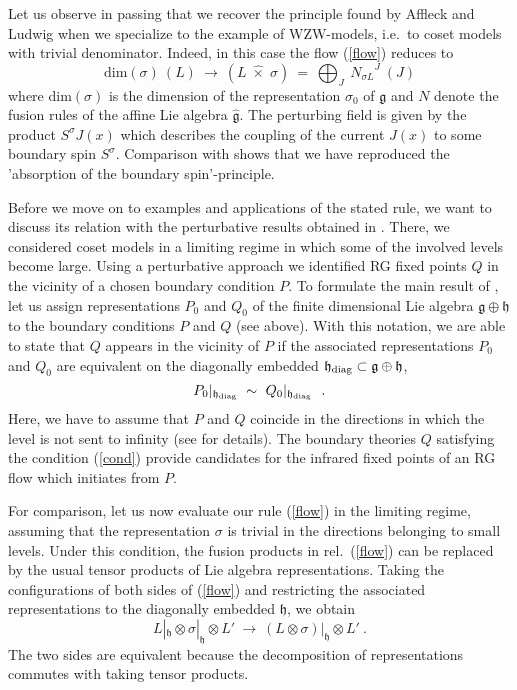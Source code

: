 \documentclass[a4paper,prd,twocolumn,nobibnotes,amssymb,preprintnumbers]{revtex4}
\begin{document}
Let us observe in passing that we recover the principle found by 
Affleck and Ludwig when we specialize to the example of WZW-models, 
i.e.\ to coset models with trivial denominator. Indeed, in this 
case the flow (\ref{flow}) reduces to
\[
\text{dim} (\sigma)\ (L)\ \longrightarrow \ (L \; \hat{\times}\;  \sigma) 
\ = \ {\bigoplus}_{J}\  {N_{\sigma L}}^{J}
\ (J)
\]
where dim$(\sigma)$ is the dimension of the representation 
$\sigma_0$ of $\mathfrak{g}$ and $N$ denote the fusion rules of the 
affine Lie algebra $\hat{\mathfrak{g}}$. The perturbing field is given 
by the product $S^{\sigma } J(x)$ which describes the coupling 
of the current $J(x)$ to some boundary spin $S^\sigma$. Comparison 
with \cite{Affleck:1991by} shows that we have reproduced the 'absorption 
of the boundary spin'-principle. 
\medskip 

Before we move on to examples and applications of the stated rule, 
we want to discuss its relation with the perturbative results 
obtained in \cite{Fredenhagen:2001kw}. There, we considered 
coset models in a limiting regime in which some of the involved 
levels become large. Using a perturbative approach we identified 
RG fixed points $Q$ in the vicinity of a chosen boundary condition 
$P$. To formulate the main result of \cite{Fredenhagen:2001kw}, let
us assign representations $P_0$ and $Q_0$ of the finite dimensional 
Lie algebra $\mathfrak{g} \oplus \mathfrak{h}$ to the boundary conditions $P$ and
$Q$ (see above). With this notation, we are able to state that 
$Q$ appears in the vicinity of $P$ if the associated representations
$P_0$ and $Q_0$ are equivalent on the diagonally embedded 
$\mathfrak{h}_{\rm diag} \subset \mathfrak{g} \oplus \mathfrak{h} $,
\begin{equation} \label{cond} 
P_0|_{\mathfrak{h}_{\rm diag}}\ \sim \ Q_0|_{\mathfrak{h}_{\rm diag}}\ \ .
\end{equation} 
Here, we have to assume that $P$ and $Q$ coincide in the directions 
in which the level is not sent to infinity (see \cite{Fredenhagen:2001kw}
for details). The boundary theories $Q$ satisfying the condition 
(\ref{cond}) provide candidates for the infrared fixed points of 
an RG flow which initiates from $P$. 

For comparison, let us now evaluate our rule (\ref{flow}) in the limiting 
regime, assuming that the representation $\sigma $ is trivial in 
the directions belonging to small levels. Under this condition, the 
fusion products in rel.\ (\ref{flow}) can be replaced by the usual 
tensor products of Lie algebra representations. Taking the 
configurations of both sides of (\ref{flow}) and restricting 
the associated representations to the diagonally embedded $\mathfrak{h}$, we 
obtain
\[
L|_{\mathfrak{h}}\otimes \sigma|_{\mathfrak{h}}\otimes L' \ \longrightarrow\ (L\otimes
\sigma )|_{\mathfrak{h}}\otimes L'\ .
\]
The two sides are equivalent because the decomposition of
representations commutes with taking tensor products.
\medskip 
\end{document}
